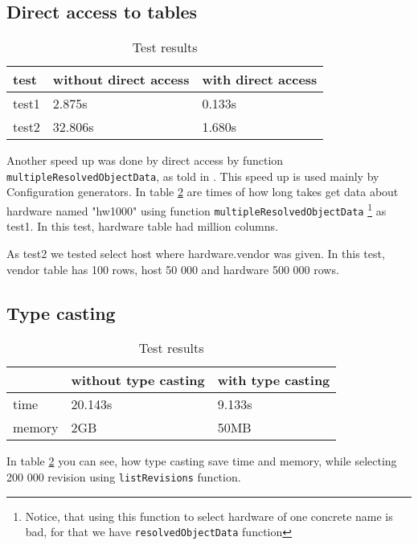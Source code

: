 \documentclass[deska]{subfiles}
\begin{document}
\subsection{Direct access to tables}
\label{sec:test-direct}

\begin{longtable}{ l | l | l }
\caption{Test results}\\
\label{test:direct}
test & without direct access & with direct access \\
\hline
\endhead
test1 & 2.875s & 0.133s \\
test2 & 32.806s & 1.680s \\
\end{longtable}

Another speed up was done by direct access by function {\tt multipleResolvedObjectData}, as told in .
This speed up is used mainly by Configuration generators.
In table \ref{test:direct} are times of how long takes get data about hardware named "hw1000" using function {\tt multipleResolvedObjectData}
\footnote{Notice, that using this function to select hardware of one concrete name is bad, for that we have
{\tt resolvedObjectData} function}
as test1. In this test, hardware table had million columns.

As test2 we tested select host where hardware.vendor was given. In this test, vendor table
has 100 rows, host 50 000 and hardware 500 000 rows.

\subsection{Type casting}
\label{sec:test-cast}

\begin{longtable}{ l | l | l }
\caption{Test results}
\label{test:direct}\\
& without type casting & with type casting \\
\hline
\endhead
time & 20.143s & 9.133s \\
memory & 2GB & 50MB \\
\end{longtable}

In table \ref{test:direct} you can see, how type casting save time and memory,
while selecting 200 000 revision using {\tt listRevisions} function.
\end{document}

